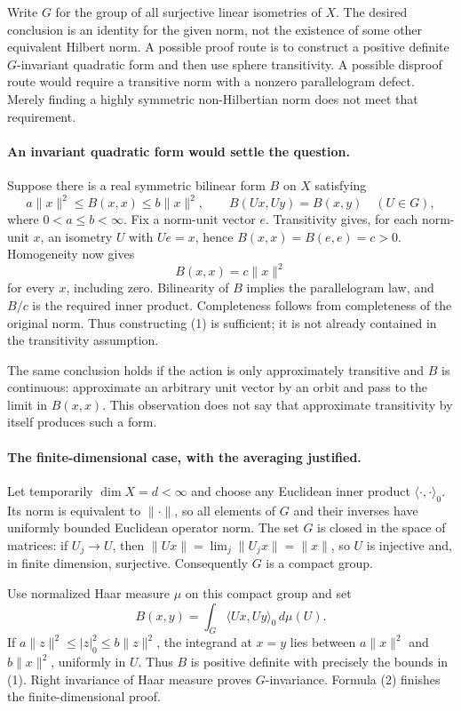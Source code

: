 \documentclass[11pt]{article}
\begin{document}
Write $G$ for the group of all surjective linear isometries of $X$.
The desired conclusion is an identity for the given norm, not the
existence of some other equivalent Hilbert norm. A possible proof route
is to construct a positive definite $G$-invariant quadratic form and
then use sphere transitivity. A possible disproof route would require
a transitive norm with a nonzero parallelogram defect. Merely finding
a highly symmetric non-Hilbertian norm does not meet that requirement.

\paragraph{An invariant quadratic form would settle the question.}
Suppose there is a real symmetric bilinear form $B$ on $X$ satisfying
\[
 a\|x\|^2\le B(x,x)\le b\|x\|^2,
 \qquad B(Ux,Uy)=B(x,y)\quad(U\in G),                 \tag{1}
\]
where $0<a\le b<\infty$. Fix a norm-unit vector $e$.
Transitivity gives, for each norm-unit $x$, an isometry $U$ with
$Ue=x$, hence $B(x,x)=B(e,e)=c>0$. Homogeneity now gives
\[
                         B(x,x)=c\|x\|^2             \tag{2}
\]
for every $x$, including zero. Bilinearity of $B$ implies the
parallelogram law, and $B/c$ is the required inner product.
Completeness follows from completeness of the original norm.
Thus constructing (1) is sufficient; it is not already contained in
the transitivity assumption.

The same conclusion holds if the action is only approximately
transitive and $B$ is continuous: approximate an arbitrary unit vector
by an orbit and pass to the limit in $B(x,x)$. This observation does not
say that approximate transitivity by itself produces such a form.

\paragraph{The finite-dimensional case, with the averaging justified.}
Let temporarily $\dim X=d<\infty$ and choose any Euclidean inner product
$\langle\cdot,\cdot\rangle_0$. Its norm is equivalent to $\|\cdot\|$,
so all elements of $G$ and their inverses have uniformly bounded
Euclidean operator norm. The set $G$ is closed in the space of matrices:
if $U_j\to U$, then $\|Ux\|=\lim_j\|U_jx\|=\|x\|$, so $U$ is
injective and, in finite dimension, surjective. Consequently $G$ is a
compact group.

Use normalized Haar measure $\mu$ on this compact group and set
\[
              B(x,y)=\int_G\langle Ux,Uy\rangle_0\,d\mu(U).
                                                               \tag{3}
\]
If $a\|z\|^2\le|z|_0^2\le b\|z\|^2$, the integrand at $x=y$
lies between $a\|x\|^2$ and $b\|x\|^2$, uniformly in $U$.
Thus $B$ is positive definite with precisely the bounds in (1).
Right invariance of Haar measure proves $G$-invariance. Formula (2)
finishes the finite-dimensional proof.
\end{document}
